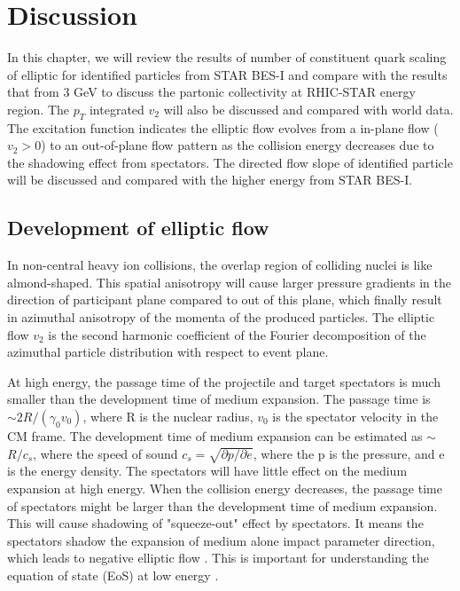 \section{Discussion} 
In this chapter, we will review the results of number of constituent quark scaling of elliptic for identified particles from STAR BES-I and compare with the results that from 3 GeV to discuss the partonic collectivity at RHIC-STAR energy region.  The $p_{T}$ integrated $v_{2}$ will also be discussed and compared with world data. The excitation function indicates the elliptic flow evolves from a in-plane flow ($v_{2} > 0$) to an out-of-plane flow pattern as the collision energy decreases due to the shadowing effect from spectators. The directed flow slope of identified particle will be discussed and compared with the higher energy from STAR BES-I. 

\subsection{Development of elliptic flow}
In non-central heavy ion collisions, the overlap region of colliding nuclei is like almond-shaped. This spatial anisotropy will cause larger pressure gradients in the direction of participant plane compared to out of this plane, which finally result in azimuthal anisotropy of the momenta of the produced particles. The elliptic flow $v_{2}$ is the second harmonic coefficient of the Fourier decomposition of the azimuthal particle distribution with respect to event plane.

At high energy, the passage time of the projectile and target spectators is much smaller than the development time of medium expansion. The passage time is $ \sim 2R/(\gamma_{0} v_{0})$, where R is the nuclear radius, $v_{0}$ is the spectator velocity in the CM frame. The development time of medium expansion can be estimated as $\sim$ $R/c_{s}$, where the speed of sound $c_{s} = \sqrt{\partial p/\partial e}$, where the p is the pressure, and e is the energy density. The spectators will have little effect on the medium expansion at high energy. When the collision energy decreases, the passage time of spectators might be larger than the development time of medium expansion. This will cause shadowing of "squeeze-out" effect by spectators. It means the spectators shadow the expansion of medium alone impact parameter direction, which leads to negative elliptic flow \cite{Pinkenburg:1999ya}. This is important for understanding the equation of state (EoS) at low energy \cite{Danielewicz:1998vz, Danielewicz:2002pu}.


